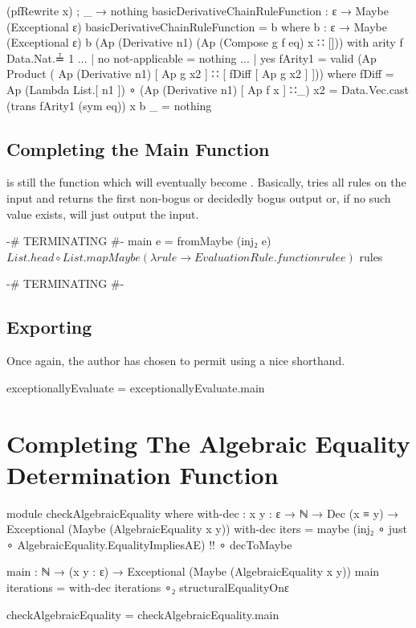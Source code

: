 \documentclass{report}
\begin{document}
\begin{code}
{                           (pfRewrite x)
          ; _ → nothing}
      basicDerivativeChainRuleFunction : ε → Maybe (Exceptional ε)
      basicDerivativeChainRuleFunction = b
        where
        b : ε → Maybe (Exceptional ε)
        b (Ap (Derivative n1) (Ap (Compose g f eq) x ∷ [])) with arity f Data.Nat.≟ 1
        ... | no not-applicable = nothing
        ... | yes fArity1 =
          valid (Ap Product
                    ( Ap (Derivative n1) [ Ap g x2 ]
                    ∷ [ fDiff [ Ap g x2 ] ]))
            where
            fDiff = Ap (Lambda List.[ n1 ]) ∘ (Ap (Derivative n1) [ Ap f x ] ∷_)
            x2 = Data.Vec.cast (trans fArity1 (sym eq)) x
        b _ = nothing
\end{code}

\subsection{Completing the Main Function}
 is still the function which will eventually become .  Basically,  tries all  rules on the input and returns the first non-bogus or decidedly bogus output or, if no such value exists, will just output the input.

\begin{code}
    {-# TERMINATING #-}
    main e = fromMaybe (inj₂ e)
           $ List.head ∘ List.mapMaybe (λ rule → EvaluationRule.function rule e)
           $ rules

  {-# TERMINATING #-}
\end{code}

\subsection{Exporting}
Once again, the author has chosen to permit using a nice shorthand.

\begin{code}
  exceptionallyEvaluate = exceptionallyEvaluate.main
\end{code}

\section{Completing The Algebraic Equality Determination Function}

\begin{code}
  module checkAlgebraicEquality where
    with-dec : {x y : ε} →
               ℕ →
               Dec (x ≡ y) →
               Exceptional (Maybe (AlgebraicEquality x y))
    with-dec iters = maybe (inj₂ ∘ just ∘ AlgebraicEquality.EqualityImpliesAE)
                           {!!}
                   ∘ decToMaybe

    main : ℕ → (x y : ε) → Exceptional (Maybe (AlgebraicEquality x y))
    main iterations = with-dec iterations ∘₂ structuralEqualityOnε

  checkAlgebraicEquality = checkAlgebraicEquality.main
\end{code}
\end{document}
